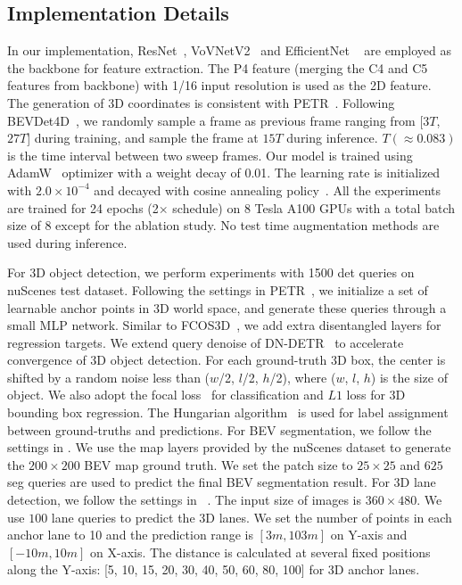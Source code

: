 \documentclass[10pt,twocolumn,letterpaper]{article}
\begin{document}
\subsection{Implementation Details}
In our implementation, ResNet~\cite{he2016resnet}, VoVNetV2~\cite{lee2020centermask} and EfficientNet ~\cite{tan2019efficientnet} are employed as the backbone for feature extraction. The P4 feature (merging the C4 and C5 features from backbone) with 1/16 input resolution is used as the 2D feature. The generation of 3D coordinates is consistent with PETR~\cite{liu2022petr}. Following BEVDet4D~\cite{huang2022bevdet4d}, we randomly sample a frame as previous frame ranging from [$3T$, $27T$] during training, and sample the frame at $15T$ during inference.
$T (\approx 0.083)$ is the time interval between two sweep frames. Our model is trained using AdamW~\cite{loshchilov2017decoupled} optimizer with a weight decay of 0.01. The learning rate is initialized with $2.0\times10^{-4}$ and decayed with cosine annealing policy~\cite{loshchilov2016sgdr}. All the experiments are trained for 24 epochs (2$\times$ schedule) on 8 Tesla A100 GPUs with a total batch size of 8 except for the ablation study. No test time augmentation methods are used during inference.

For 3D object detection, we perform experiments with 1500 det queries on nuScenes test dataset. Following the settings in PETR~\cite{liu2022petr}, we initialize a set of learnable anchor points in 3D world space, and generate these queries through a small MLP network. Similar to FCOS3D~\cite{wang2021fcos3d}, we add extra disentangled layers for regression targets. 
We extend query denoise of DN-DETR~\cite{li2022dn} to accelerate convergence of 3D object detection. For each ground-truth 3D box, the center is shifted by a random noise less than ($w$/2, $l$/2, $h$/2), where ($w$, $l$, $h$) is the size of object.
We also adopt the focal loss~\cite{lin2017focal} for classification and $L1$ loss for 3D bounding box regression. The Hungarian algorithm~\cite{kuhn1955hungarian} is used for label assignment between ground-truths and predictions. For BEV segmentation, we follow the settings in \cite{philion2020lift}. We use the map layers provided by the nuScenes dataset to generate the $200 \times 200$ BEV map ground truth. We set the patch size to $25 \times 25$ and $625$ seg queries are used to predict the final BEV segmentation result. For 3D lane detection, we follow the settings in ~\cite{chen2022persformer}.
The input size of images is $360 \times 480$. We use $100$ lane queries to predict the 3D lanes.  
We set the number of points in each anchor lane to 10 and the prediction range is $[3m,103m]$ on Y-axis and $[-10m,10m]$ on X-axis. The distance is calculated at several fixed positions along the Y-axis: [5, 10, 15, 20, 30, 40, 50, 60, 80, 100] for 3D anchor lanes.  
\end{document}

